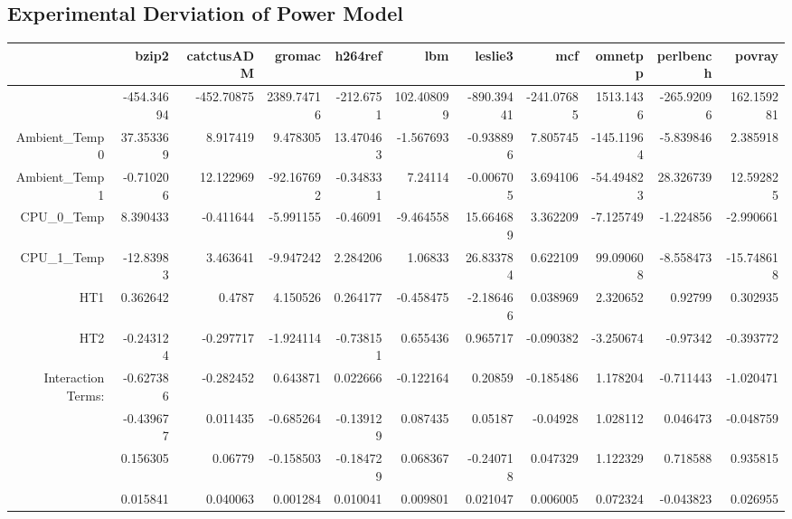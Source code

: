 \documentclass[times, 10pt,onecolumn]{article}
\begin{document}
\subsection{Experimental Derviation of Power Model}
\label{sec:model}
\begin{table}
  \centering
\begin{tabular}{|r|r|r|r|r|r|r|r|r|r|r|}
\hline
           &      bzip2 & catctusADM &     gromac &    h264ref &        lbm &    leslie3 &        mcf &    omnetpp &  perlbench &     povray \\
\hline
\hline
           & -454.34694 & -452.70875 & 2389.74716 &  -212.6751 & 102.408099 & -890.39441 & -241.07685 &  1513.1436 & -265.92096 & 162.159281 \\
\hline
Ambient\_Temp0 &  37.353369 &   8.917419 &   9.478305 &  13.470463 &  -1.567693 &  -0.938896 &   7.805745 & -145.11964 &  -5.839846 &   2.385918 \\
\hline
Ambient\_Temp1 &  -0.710206 &  12.122969 & -92.167692 &  -0.348331 &    7.24114 &  -0.006705 &   3.694106 & -54.494823 &  28.326739 &  12.592825 \\
\hline
CPU\_0\_Temp &   8.390433 &  -0.411644 &  -5.991155 &   -0.46091 &  -9.464558 &  15.664689 &   3.362209 &  -7.125749 &  -1.224856 &  -2.990661 \\
\hline
CPU\_1\_Temp &  -12.83983 &   3.463641 &  -9.947242 &   2.284206 &    1.06833 &  26.833784 &   0.622109 &  99.090608 &  -8.558473 & -15.748618 \\
\hline
       HT1 &   0.362642 &     0.4787 &   4.150526 &   0.264177 &  -0.458475 &  -2.186466 &   0.038969 &   2.320652 &    0.92799 &   0.302935 \\
\hline
       HT2 &  -0.243124 &  -0.297717 &  -1.924114 &  -0.738151 &   0.655436 &   0.965717 &  -0.090382 &  -3.250674 &   -0.97342 &  -0.393772 \\
\hline
Interaction Terms: &  -0.627386 &  -0.282452 &   0.643871 &   0.022666 &  -0.122164 &    0.20859 &  -0.185486 &   1.178204 &  -0.711443 &  -1.020471 \\
\hline
           &  -0.439677 &   0.011435 &  -0.685264 &  -0.139129 &   0.087435 &    0.05187 &   -0.04928 &   1.028112 &   0.046473 &  -0.048759 \\
\hline
           &   0.156305 &    0.06779 &  -0.158503 &  -0.184729 &   0.068367 &  -0.240718 &   0.047329 &   1.122329 &   0.718588 &   0.935815 \\
\hline
           &   0.015841 &   0.040063 &   0.001284 &   0.010041 &   0.009801 &   0.021047 &   0.006005 &   0.072324 &  -0.043823 &   0.026955 \\

\end{tabular}
\end{table}
\end{document}
